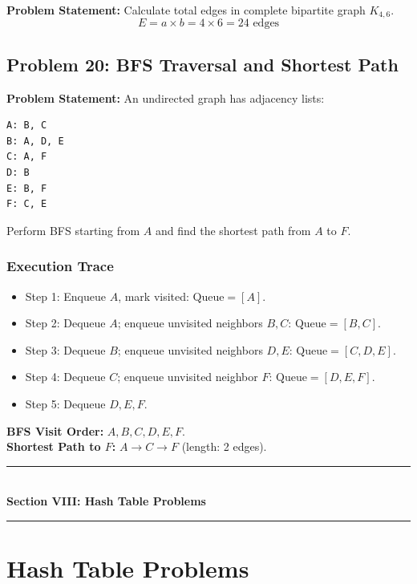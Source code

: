 \textbf{Problem Statement:} Calculate total edges in complete bipartite graph $K_{4,6}$.
\[
E = a \times b = 4 \times 6 = \boxed{24 \text{ edges}}
\]

\subsection{Problem 20: BFS Traversal and Shortest Path}

\textbf{Problem Statement:} An undirected graph has adjacency lists:
\begin{lstlisting}[style=pseudocode]
A: B, C
B: A, D, E
C: A, F
D: B
E: B, F
F: C, E
\end{lstlisting}
Perform BFS starting from $A$ and find the shortest path from $A$ to $F$.

\subsubsection*{Execution Trace}
\begin{itemize}
    \item Step 1: Enqueue $A$, mark visited: $\text{Queue} = [A]$.
    \item Step 2: Dequeue $A$; enqueue unvisited neighbors $B, C$: $\text{Queue} = [B, C]$.
    \item Step 3: Dequeue $B$; enqueue unvisited neighbors $D, E$: $\text{Queue} = [C, D, E]$.
    \item Step 4: Dequeue $C$; enqueue unvisited neighbor $F$: $\text{Queue} = [D, E, F]$.
    \item Step 5: Dequeue $D, E, F$.
\end{itemize}
\textbf{BFS Visit Order:} $\boxed{A, B, C, D, E, F}$.\\
\textbf{Shortest Path to $F$:} $\boxed{A \to C \to F}$ (length: 2 edges).

\newpage
\begin{center}
\vspace{0.5em}
{\color{primary}\rule{0.45\textwidth}{1.2pt}}\\[4pt]
{\Large\bfseries\color{primary} Section VIII: Hash Table Problems}\\[2pt]
{\color{primary}\rule{0.45\textwidth}{1.2pt}}
\vspace{0.5em}
\end{center}

\section{Hash Table Problems}

